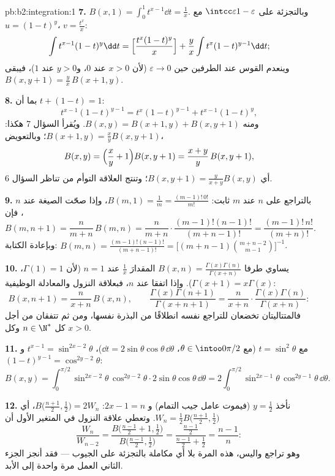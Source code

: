 \begin{solution}{pb:b2:integration:1}
\textbf{7.} $B(x,1) = \int_0^1 t^{x-1}\dd t = \frac1x$. وبالتجزئة
على $\intcc\varepsilon{1-\varepsilon}$ مع $u = (1-t)^y$، $v =
\frac{t^x}{x}$:
\[
\int t^{x-1}(1-t)^{y}\dd t
= \Bigl[\frac{t^x(1-t)^y}{x}\Bigr]
+ \frac{y}{x}\int t^{x}(1-t)^{y-1}\dd t ;
\]
وينعدم القوس عند الطرفين حين $\varepsilon \to 0$ (لأن $x >
0$ عند $0$، و$y > 0$ عند $1$)، فيبقى $B(x, y+1) = \frac
yx\,B(x+1, y)$.

\textbf{8.} بما أن $t + (1-t) = 1$:
\[
t^{x-1}(1-t)^{y-1} = t^{x}(1-t)^{y-1} + t^{x-1}(1-t)^{y},
\]
ومنه $B(x,y) = B(x+1,y) + B(x,y+1)$. ويُقرأ السؤال 7 هكذا: $B(x+1,y) =
\frac xy B(x,y+1)$؛ وبالتعويض،
\[
B(x,y) = \Bigl(\frac xy + 1\Bigr)B(x,y+1)
= \frac{x+y}{y}\,B(x,y+1),
\]
أي $B(x,y+1) = \frac{y}{x+y}B(x,y)$؛ وتنتج العلاقة التوأم
من تناظر السؤال 6.

\textbf{9.} بالتراجع على $n$ عند $m$ ثابت: $B(m,1) = \frac1m =
\frac{(m-1)!\,0!}{m!}$، وإذا صحّت الصيغة عند $n$، فإن
\[
B(m, n+1) = \frac{n}{m+n}\,B(m,n)
= \frac{n}{m+n}\cdot\frac{(m-1)!(n-1)!}{(m+n-1)!}
= \frac{(m-1)!\,n!}{(m+n)!} .
\]
وبإعادة الكتابة: $B(m,n) = \frac{(m-1)!(n-1)!}{(m+n-1)!} =
\bigl[(m+n-1)\binom{m+n-2}{m-1}\bigr]^{-1}$.

\textbf{10.} يساوي طرفا $B(x,n) =
\frac{\Gamma(x)\Gamma(n)}{\Gamma(x+n)}$ المقدارَ $\frac1x$ عند $n =
1$ (لأن $\Gamma(1) = 1$، $\Gamma(x+1) = x\Gamma(x)$). وإذا اتفقا
عند $n$، فبعلاقة النزول والمعادلة
الوظيفية:
\[
B(x, n+1) = \frac{n}{x+n}\,B(x,n), \qquad
\frac{\Gamma(x)\Gamma(n+1)}{\Gamma(x+n+1)}
= \frac{n}{x+n}\cdot
\frac{\Gamma(x)\Gamma(n)}{\Gamma(x+n)} :
\]
فالمتتاليتان تخضعان للتراجع نفسه انطلاقًا من البذرة نفسها،
ومن ثم تتفقان من أجل كل $n \in \N^*$ وكل $x > 0$.

\textbf{11.} مع $t = \sin^2\theta$ (مع $\theta \in
\intoo0{\pi/2}$، $\dd t = 2\sin\theta\cos\theta\,\dd\theta$)،
$t^{x-1} = \sin^{2x-2}\theta$ و$(1-t)^{y-1} =
\cos^{2y-2}\theta$:
\[
B(x,y) = \int_0^{\pi/2}\sin^{2x-2}\theta\,\cos^{2y-2}\theta
\cdot 2\sin\theta\cos\theta\,\dd\theta
= 2\int_0^{\pi/2}\sin^{2x-1}\theta\,\cos^{2y-1}\theta\,
\dd\theta .
\]

\textbf{12.} نأخذ $y = \frac12$ (فيموت عامل جيب التمام) و
$2x - 1 = n$: $B\bigl(\frac{n+1}2, \frac12\bigr) = 2W_n$، أي
$W_n = \frac12 B\bigl(\frac{n+1}2,\frac12\bigr)$. وتعطي علاقة النزول
في المتغير الأول أن
\[
\frac{W_n}{W_{n-2}}
= \frac{B\bigl(\frac{n-1}2 + 1, \frac12\bigr)}
{B\bigl(\frac{n-1}2, \frac12\bigr)}
= \frac{\frac{n-1}2}{\frac{n-1}2 + \frac12}
= \frac{n-1}{n} :
\]
وهو تراجع واليس، هذه المرة بلا أي مكاملة بالتجزئة
على الجيوب --- فقد أنجز الجزء الثاني العمل مرة واحدة إلى الأبد.


\end{solution}
